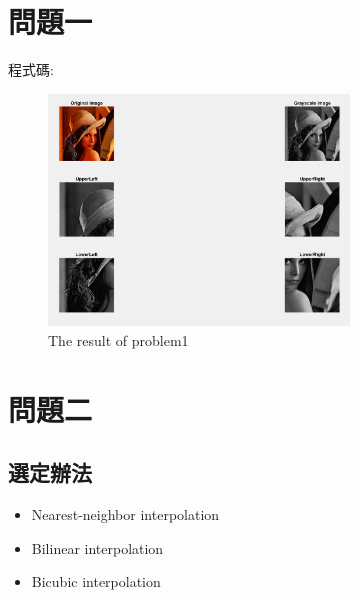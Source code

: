 \documentclass[conference]{IEEEtran}
\begin{document}


\section{問題一}
程式碼:\\

\begin{figure}[H]
\centerline{\includegraphics[width=8cm]{problem1.png}}
\caption{The result of problem1}
\label{fig}
\end{figure}

\section{問題二}
\subsection{選定辦法}
\begin{itemize}
\item Nearest-neighbor interpolation
\item Bilinear interpolation
\item Bicubic interpolation
\end{itemize}
\end{document}
